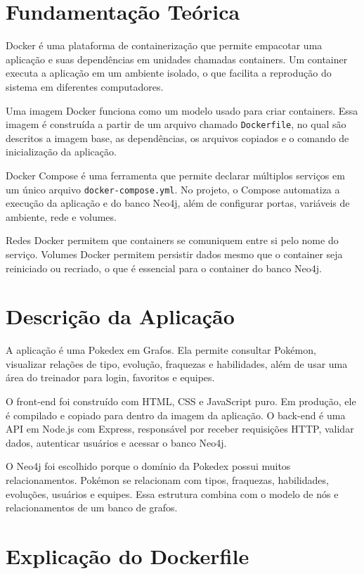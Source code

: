 \documentclass[12pt,a4paper]{article}
\begin{document}
\section{Fundamentação Teórica}

Docker é uma plataforma de containerização que permite empacotar uma aplicação e suas dependências em unidades chamadas containers. Um container executa a aplicação em um ambiente isolado, o que facilita a reprodução do sistema em diferentes computadores.

Uma imagem Docker funciona como um modelo usado para criar containers. Essa imagem é construída a partir de um arquivo chamado \texttt{Dockerfile}, no qual são descritos a imagem base, as dependências, os arquivos copiados e o comando de inicialização da aplicação.

Docker Compose é uma ferramenta que permite declarar múltiplos serviços em um único arquivo \texttt{docker-compose.yml}. No projeto, o Compose automatiza a execução da aplicação e do banco Neo4j, além de configurar portas, variáveis de ambiente, rede e volumes.

Redes Docker permitem que containers se comuniquem entre si pelo nome do serviço. Volumes Docker permitem persistir dados mesmo que o container seja reiniciado ou recriado, o que é essencial para o container do banco Neo4j.

\section{Descrição da Aplicação}

A aplicação é uma Pokedex em Grafos. Ela permite consultar Pokémon, visualizar relações de tipo, evolução, fraquezas e habilidades, além de usar uma área do treinador para login, favoritos e equipes.

O front-end foi construído com HTML, CSS e JavaScript puro. Em produção, ele é compilado e copiado para dentro da imagem da aplicação. O back-end é uma API em Node.js com Express, responsável por receber requisições HTTP, validar dados, autenticar usuários e acessar o banco Neo4j.

O Neo4j foi escolhido porque o domínio da Pokedex possui muitos relacionamentos. Pokémon se relacionam com tipos, fraquezas, habilidades, evoluções, usuários e equipes. Essa estrutura combina com o modelo de nós e relacionamentos de um banco de grafos.

\section{Explicação do Dockerfile}
\end{document}
